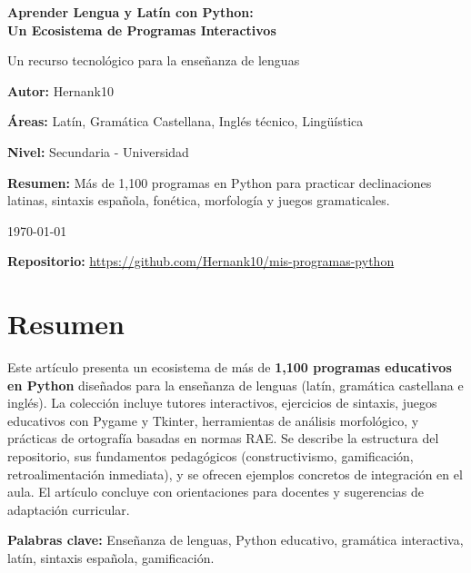 \documentclass[12pt,spanish]{article}
\newcommand{\autor}{Hernank10}
\newcommand{\titulo}{Aprender Lengua y Latín con Python: \\
Un Ecosistema de Programas Interactivos}
\begin{document}
\begin{titlepage}
    \centering
    \vspace*{2cm}
    {\Huge \textbf{\titulo} \par}
    \vspace{0.5cm}
    {\Large \textcolor{color1}{Un recurso tecnológico para la enseñanza de lenguas} \par}
    \vspace{1.5cm}
    {\large \textbf{Autor:} \autor \par}
    \vspace{0.5cm}
    {\large \textbf{Áreas:} Latín, Gramática Castellana, Inglés técnico, Lingüística \par}
    \vspace{0.5cm}
    {\large \textbf{Nivel:} Secundaria - Universidad \par}
    \vspace{2cm}
    {\large \textbf{Resumen:} Más de 1,100 programas en Python para practicar declinaciones latinas, sintaxis española, fonética, morfología y juegos gramaticales. \par}
    \vspace{2cm}
    {\large \today \par}
    \vfill
    {\large \textbf{Repositorio:} \url{https://github.com/Hernank10/mis-programas-python} \par}
\end{titlepage}

\section*{Resumen}

Este artículo presenta un ecosistema de más de \textbf{1,100 programas educativos en Python} diseñados para la enseñanza de lenguas (latín, gramática castellana e inglés). La colección incluye tutores interactivos, ejercicios de sintaxis, juegos educativos con Pygame y Tkinter, herramientas de análisis morfológico, y prácticas de ortografía basadas en normas RAE. Se describe la estructura del repositorio, sus fundamentos pedagógicos (constructivismo, gamificación, retroalimentación inmediata), y se ofrecen ejemplos concretos de integración en el aula. El artículo concluye con orientaciones para docentes y sugerencias de adaptación curricular.

\textbf{Palabras clave:} Enseñanza de lenguas, Python educativo, gramática interactiva, latín, sintaxis española, gamificación.
\end{document}
